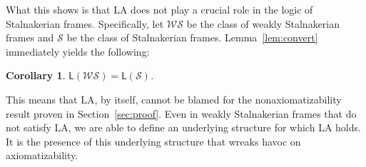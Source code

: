 \documentclass[12pt]{article}
\newtheorem{corollary}{Corollary}
\newcommand{\would}{\mathbin{>}}
\newcommand{\nec}{\mathop{\Box}}
\newcommand{\pos}{\mathop{\Diamond}}
\newcommand{\class}[1]{\mathcal{#1}}
\newcommand{\WS}{\class{WS}}
\renewcommand{\S}{\class{S}}
\begin{document}
What this shows is that LA does not play a crucial role in the logic of Stalnakerian frames. 
Specifically, let $\WS$ be the class of weakly Stalnakerian frames and $\S$ be the class of Stalnakerian frames. 
Lemma~\ref{lem:convert} immediately yields the following:

\begin{corollary}\label{cor:equiv}
    $\mathsf{L}(\mathcal{WS}) = \mathsf{L}(\mathcal{S})$.
\end{corollary}

\noindent This means that LA, by itself, cannot be blamed for the nonaxiomatizability result proven in Section~\ref{sec:proof}. 
Even in weakly Stalnakerian frames that do not satisfy LA, we are able to define an underlying structure for which LA holds. 
It is the presence of this underlying structure that wreaks havoc on axiomatizability. 


\end{document}

